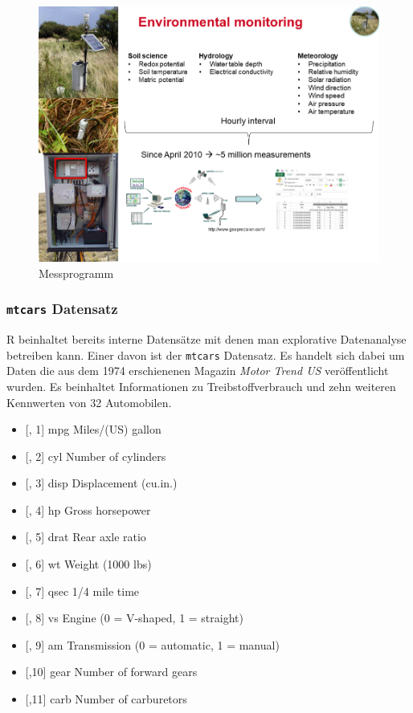 \documentclass[
]{article}
\providecommand{\tightlist}{%
  \setlength{\itemsep}{0pt}\setlength{\parskip}{0pt}}
\begin{document}
\begin{figure}

{\centering \includegraphics[width=13.33in]{images/003} 

}

\caption{Messprogramm}\label{fig:unnamed-chunk-5}
\end{figure}

\hypertarget{mtcars-datensatz}{%
\subsubsection{\texorpdfstring{\texttt{mtcars} Datensatz}{mtcars Datensatz}}\label{mtcars-datensatz}}

R beinhaltet bereits interne Datensätze mit denen man explorative Datenanalyse betreiben kann. Einer davon ist der \texttt{mtcars} Datensatz. Es handelt sich dabei um Daten die aus dem 1974 erschienenen Magazin \emph{Motor Trend US} veröffentlicht wurden. Es beinhaltet Informationen zu Treibstoffverbrauch und zehn weiteren Kennwerten von 32 Automobilen.

\begin{itemize}
\tightlist
\item
  {[}, 1{]} mpg Miles/(US) gallon
\item
  {[}, 2{]} cyl Number of cylinders
\item
  {[}, 3{]} disp Displacement (cu.in.)
\item
  {[}, 4{]} hp Gross horsepower
\item
  {[}, 5{]} drat Rear axle ratio
\item
  {[}, 6{]} wt Weight (1000 lbs)
\item
  {[}, 7{]} qsec 1/4 mile time
\item
  {[}, 8{]} vs Engine (0 = V-shaped, 1 = straight)
\item
  {[}, 9{]} am Transmission (0 = automatic, 1 = manual)
\item
  {[},10{]} gear Number of forward gears
\item
  {[},11{]} carb Number of carburetors
\end{itemize}
\end{document}
